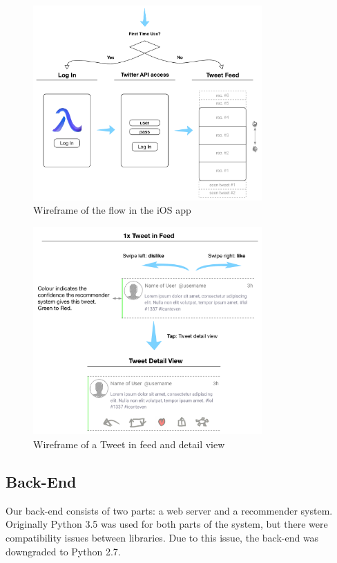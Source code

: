 \documentclass{article}
\begin{document}
\newpage


\begin{figure}[H]
    \centering
    \includegraphics[width=0.78\textwidth]{ios_wireframe_1}  
    \caption{Wireframe of the flow in the iOS app}
\end{figure}

\begin{figure}[H]
    \centering
    \includegraphics[width=0.78\textwidth]{ios_wireframe_2}  
    \caption{Wireframe of a Tweet in feed and detail view}
\end{figure}

\subsection{Back-End}
Our back-end consists of two parts: a web server and a recommender system. Originally Python 3.5 was used for both parts of the system, but there were compatibility issues between libraries. Due to this issue, the back-end was downgraded to Python 2.7.
\end{document}
